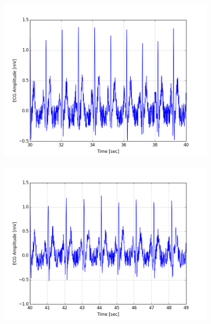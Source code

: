 \documentclass[paper=a4, fontsize=11pt]{scrartcl}
\numberwithin{equation}{section}		%
\numberwithin{figure}{section}			%
\numberwithin{table}{section}		    %
\begin{document}
\begin{appendices}
\begin{figure}[H]
	\centering
	\begin{subfigure}[b]{0.3\textwidth}
		\includegraphics[width=\textwidth]{sim/ecg_4}
	\end{subfigure}
	\begin{subfigure}[b]{0.3\textwidth}
		\includegraphics[width=\textwidth]{sim/ecg_5}
	\end{subfigure}
	\begin{subfigure}[b]{0.3\textwidth}

\end{subfigure}
\end{figure}
\end{appendices}
\end{document}
